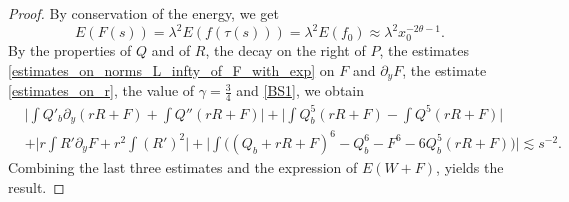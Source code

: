 \documentclass[16pt,english, oneside,reqno]{smfart}
\begin{document}
\begin{proof}
    By conservation of the energy, we get
    \begin{equation}
        E(F(s)) = \lambda^2E(f(\tau(s))) = \lambda^2 E(f_0) \approx \lambda^2 x^{-2\theta - 1}_0.
    \end{equation}
    By the properties of $Q$ and of $R$, the decay on the right of $P$, the estimates \eqref{estimates_on_norms_L_infty_of_F_with_exp} on $F$ and $\partial_yF$, the estimate \eqref{estimates_on_r}, the value of $\gamma = \frac{3}{4}$ and \eqref{BS1}, we obtain
    \begin{equation}
    \begin{split}
        & \Big\lvert \int Q'_b \partial_y(rR+F) + \int Q''(rR+F) \Big\rvert
        + \Big\lvert \int Q^5_b(rR+F) - \int Q^5 (rR+F) \Big\rvert \\
        & +\Big\lvert r\int R' \partial_y F + r^2 \int (R')^2 \Big\rvert + \Big\vert \int \Big( (Q_b+rR+F)^6- Q^6_b - F^6 - 6Q^5_b(rR+F) \Big) \Big\rvert \lesssim s^{-2}.
    \end{split}
    \end{equation}
    Combining the last three estimates and the expression of $E(W+F)$, yields the result.
\end{proof}
\end{document}
